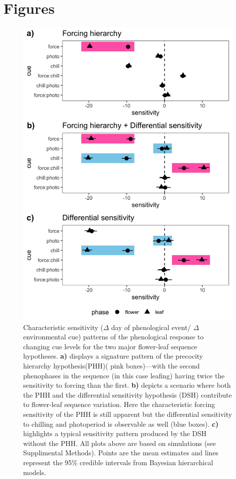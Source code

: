 \documentclass[11pt]{article}\usepackage[]{graphicx}\usepackage[]{color}
\begin{document}
\section*{Figures}
\begin{figure}[h!]
    \centering
         \includegraphics[width=.7\textwidth]{..//Plots/Flobuds_manuscript_figs/simulations.png}
    \caption{Characteristic sensitivity ($\Delta$ day of phenological event/ $\Delta$ environmental cue) patterns of the phenological response to changing cue levels for the two major flower-leaf sequence hypotheses.  \textbf{a)} displays a signature pattern of the precocity hierarchy hypothesis(PHH)( pink boxes)---with the second phenophases in the sequence (in this case leafing) having twice the sensitivity to forcing than the first. \textbf{b)} depicts a scenario where both the PHH and the differential sensitivity hypothesis (DSH) contribute to flower-leaf sequence variation. Here the characteristic forcing sensitivity of the PHH is still apparent but the differential sensitivity to chilling and photoperiod is observable as well (blue boxes). \textbf{c)} highlights a typical sensitivity pattern produced by the DSH without the PHH. All plots above are based on simulations (see Supplimental Methods). Points are the mean estimates and lines represent the 95\% credible intervals from Bayesian hierarchical models. } 
    \label{fig:simulations}
\end{figure}
\pagebreak
\end{document}
